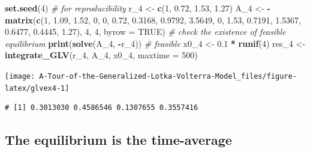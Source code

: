 \documentclass[
]{book}
\newenvironment{Shaded}{\begin{snugshade}}{\end{snugshade}}
\newcommand{\CommentTok}[1]{\textcolor[rgb]{0.56,0.35,0.01}{\textit{#1}}}
\newcommand{\DataTypeTok}[1]{\textcolor[rgb]{0.13,0.29,0.53}{#1}}
\newcommand{\DecValTok}[1]{\textcolor[rgb]{0.00,0.00,0.81}{#1}}
\newcommand{\FloatTok}[1]{\textcolor[rgb]{0.00,0.00,0.81}{#1}}
\newcommand{\KeywordTok}[1]{\textcolor[rgb]{0.13,0.29,0.53}{\textbf{#1}}}
\newcommand{\NormalTok}[1]{#1}
\newcommand{\OperatorTok}[1]{\textcolor[rgb]{0.81,0.36,0.00}{\textbf{#1}}}
\newcommand{\OtherTok}[1]{\textcolor[rgb]{0.56,0.35,0.01}{#1}}
\newcommand{\StringTok}[1]{\textcolor[rgb]{0.31,0.60,0.02}{#1}}
\begin{document}
\begin{Shaded}
\begin{Highlighting}[]
\KeywordTok{set.seed}\NormalTok{(}\DecValTok{4}\NormalTok{) }\CommentTok{# for reproducibility}
\NormalTok{r_}\DecValTok{4}\NormalTok{ <-}\StringTok{ }\KeywordTok{c}\NormalTok{(}\DecValTok{1}\NormalTok{, }\FloatTok{0.72}\NormalTok{, }\FloatTok{1.53}\NormalTok{, }\FloatTok{1.27}\NormalTok{)}
\NormalTok{A_}\DecValTok{4}\NormalTok{ <-}\StringTok{ }\OperatorTok{-}\KeywordTok{matrix}\NormalTok{(}\KeywordTok{c}\NormalTok{(}\DecValTok{1}\NormalTok{, }\FloatTok{1.09}\NormalTok{, }\FloatTok{1.52}\NormalTok{, }\DecValTok{0}\NormalTok{, }
                 \DecValTok{0}\NormalTok{, }\FloatTok{0.72}\NormalTok{, }\FloatTok{0.3168}\NormalTok{, }\FloatTok{0.9792}\NormalTok{, }
                 \FloatTok{3.5649}\NormalTok{, }\DecValTok{0}\NormalTok{, }\FloatTok{1.53}\NormalTok{, }\FloatTok{0.7191}\NormalTok{,}
                 \FloatTok{1.5367}\NormalTok{, }\FloatTok{0.6477}\NormalTok{, }\FloatTok{0.4445}\NormalTok{, }\FloatTok{1.27}\NormalTok{), }\DecValTok{4}\NormalTok{, }\DecValTok{4}\NormalTok{, }\DataTypeTok{byrow =} \OtherTok{TRUE}\NormalTok{)}
\CommentTok{# check the existence of feasible equilibrium}
\KeywordTok{print}\NormalTok{(}\KeywordTok{solve}\NormalTok{(A_}\DecValTok{4}\NormalTok{, }\OperatorTok{-}\NormalTok{r_}\DecValTok{4}\NormalTok{)) }\CommentTok{# feasible}
\NormalTok{x0_}\DecValTok{4}\NormalTok{ <-}\StringTok{ }\FloatTok{0.1} \OperatorTok{*}\StringTok{ }\KeywordTok{runif}\NormalTok{(}\DecValTok{4}\NormalTok{)}
\NormalTok{res_}\DecValTok{4}\NormalTok{ <-}\StringTok{ }\KeywordTok{integrate_GLV}\NormalTok{(r_}\DecValTok{4}\NormalTok{, A_}\DecValTok{4}\NormalTok{, x0_}\DecValTok{4}\NormalTok{, }\DataTypeTok{maxtime =} \DecValTok{500}\NormalTok{)}
\end{Highlighting}
\end{Shaded}

\begin{center}\texttt{[image: A-Tour-of-the-Generalized-Lotka-Volterra-Model\_files/figure-latex/glvex4-1]} \end{center}

\begin{verbatim}
# [1] 0.3013030 0.4586546 0.1307655 0.3557416
\end{verbatim}

\hypertarget{the-equilibrium-is-the-time-average}{%
\subsection{The equilibrium is the time-average}\label{the-equilibrium-is-the-time-average}}
\end{document}
